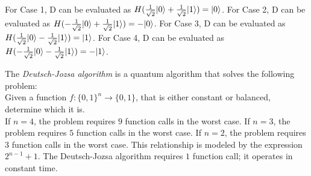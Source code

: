 For Case 1, D can be evaluated as $H(\frac{1}{\sqrt{2}}\lvert0\rangle + \frac{1}{\sqrt{2}}\lvert1\rangle) = \lvert0\rangle$. For Case 2, D can be evaluated as $H(-\frac{1}{\sqrt{2}}\lvert0\rangle + \frac{1}{\sqrt{2}}\lvert1\rangle) = -\lvert0\rangle$. For Case 3, D can be evaluated as $H(\frac{1}{\sqrt{2}}\lvert0\rangle - \frac{1}{\sqrt{2}}\lvert1\rangle) = \lvert1\rangle$. For Case 4, D can be evaluated as $H(-\frac{1}{\sqrt{2}}\lvert0\rangle - \frac{1}{\sqrt{2}}\lvert1\rangle) = -\lvert1\rangle$.

\begin{definition}
    The \emph{Deutsch-Jozsa algorithm} is a quantum algorithm that solves the following problem:\\

    Given a function $f: \{0,1\}^n \rightarrow \{0,1\}$, that is either constant or balanced, determine which it is.\\

    If $n=4$, the problem requires $9$ function calls in the worst case. If $n=3$, the problem requires $5$ function calls in the worst case. If $n=2$, the problem requires $3$ function calls in the worst case. This relationship is modeled by the expression $2^{n-1} + 1$. The Deutsch-Jozsa algorithm requires $1$ function call; it operates in constant time.
\end{definition}

